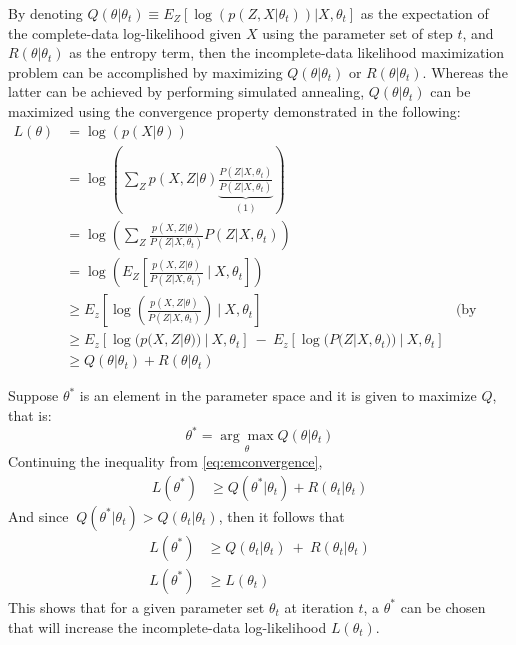 By denoting \(Q(\theta | \theta_{t}) \equiv E_{Z}[\log{(p(Z, X | \theta_{t}))}| X, \theta_{t}]\) as the expectation of the complete-data log-likelihood given \(X\) using the parameter set of step \(t\), and \(R(\theta | \theta_{t})\) as the entropy term, then the incomplete-data likelihood maximization problem can be accomplished by maximizing \(Q(\theta | \theta_{t})\) or \(R(\theta | \theta_{t})\). Whereas the latter can be achieved by performing simulated annealing, \(Q(\theta | \theta_{t})\) can be maximized using the convergence property demonstrated in the following:
\begin{equation}
\begin{aligned}
L( \theta ) & =\log( p( X|\theta )) & \\
 & =\log\left(\sum _{Z} p( X,Z|\theta )\underbrace{\frac{P( Z|X,\theta _{t})}{P( Z|X,\theta _{t})}}_{( 1)}\right) & \\
 & =\log\left(\sum _{Z}\frac{p( X,Z|\theta )}{P( Z|X,\theta _{t})} P( Z|X,\theta _{t})\right) & \\
 & =\log\left( E_{Z}\left[\frac{p( X,Z|\theta )}{P( Z|X,\theta _{t})} \ |\ X,\theta _{t}\right]\right) & \\
 & \geqslant E_{z}\left[\log\left(\frac{p( X,Z|\theta )}{P( Z|X,\theta _{t})}\right) \ |\ X,\theta _{t}\right] & \text{(by Jensen's inequality)}\\
 & \geqslant E_{z}[\log( p( X,Z|\theta )) \ |\ X,\theta _{t}] \ -\ E_{z}[\log( P( Z|X,\theta _{t})) \ |\ X,\theta _{t}] & \\
 & \geqslant Q( \theta |\theta _{t}) +R( \theta |\theta _{t}) & 
\end{aligned}
\label{eq:emconvergence}
\end{equation}

Suppose $\displaystyle \theta ^{*}$ is an element in the parameter space and it is given to maximize $\displaystyle Q$, that is:
\begin{equation*}
    \theta ^{*} =\underset{\theta }{\arg\max} Q( \theta |\theta _{t})
\end{equation*}
Continuing the inequality from \ref{eq:emconvergence},
\begin{equation*}
    \begin{aligned}
        L\left( \theta ^{*}\right) & \geqslant Q\left( \theta ^{*} |\theta _{t}\right) +R( \theta _{t} |\theta _{t})
    \end{aligned}
\end{equation*}
And since $\displaystyle \ Q\left( \theta ^{*} |\theta _{t}\right)  >Q( \theta _{t} |\theta _{t})$, then it follows that
\begin{equation}
    \begin{aligned}
        L\left( \theta ^{*}\right) & \geqslant Q( \theta _{t} |\theta _{t}) \ +\ R( \theta _{t} |\theta _{t})\\
        L\left( \theta ^{*}\right) & \geqslant L( \theta _{t})
    \end{aligned}
    \label{eq:LLinequality}
\end{equation}
This shows that for a given parameter set $\displaystyle \theta _{t}$ at iteration $\displaystyle t$, a $\displaystyle \theta ^{*}$ can be chosen that will increase the incomplete-data log-likelihood $L(\theta_t)$.


